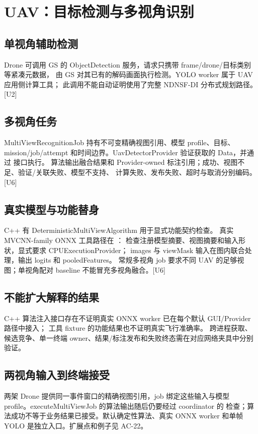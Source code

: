 \newpage

\section{UAV：目标检测与多视角识别}
\subsection{单视角辅助检测}
Drone 可调用 GS 的 ObjectDetection 服务，请求只携带 frame/drone/目标类别等紧凑元数据，
由 GS 对其已有的解码画面执行检测。YOLO worker 属于 UAV 应用侧计算工具；
此调用不能自动证明使用了完整 NDNSF-DI 分布式规划路径。[U2]

\subsection{多视角任务}
MultiViewRecognitionJob 持有不可变精确视图引用、模型 profile、目标、mission/job/attempt
和时间边界。UavDetectorProvider 验证获取的 Data，并通过
 接口执行。
算法输出融合结果和 Provider-owned 标注引用；成功、视图不足、验证/关联失败、模型不支持、
计算失败、发布失败、超时与取消分别编码。[U6]

\subsection{真实模型与功能替身}
C++ 有 DeterministicMultiViewAlgorithm 用于显式功能契约检查。
真实 MVCNN-family ONNX 工具路径在 ：
检查注册模型摘要、视图摘要和输入形状，显式要求 CPUExecutionProvider；
images 与 viewMask 输入在图内联合处理，输出 logits 和 pooledFeatures。
常规多视角 job 要求不同 UAV 的足够视图；单视角配对 baseline 不能冒充多视角融合。[U6]

\subsection{不能扩大解释的结果}
C++ 算法注入接口存在不证明真实 ONNX worker 已在每个默认 GUI/Provider 路径中接入；
工具 fixture 的功能结果也不证明真实飞行准确率。
跨进程获取、候选竞争、单一终端 owner、结果/标注发布和失败终态需在对应网络夹具中分别验证。


\subsection{两视角输入到终端接受}
两架 Drone 提供同一事件窗口的精确视图引用，job 绑定这些输入与模型 profile。executeMultiViewJob 的算法输出随后仍要经过 coordinator 的  检查；算法成功不等于业务结果已接受。默认确定性算法、真实 ONNX worker 和单帧 YOLO 是独立入口。扩展点和例子见 AC-22。

